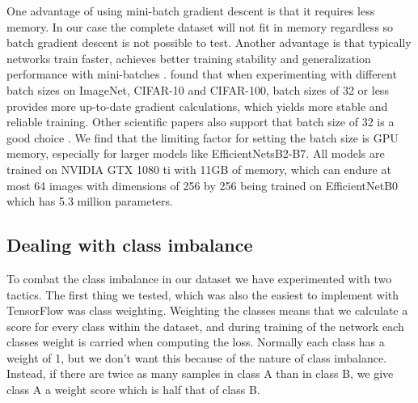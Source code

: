 \documentclass[thesis.tex]{subfiles}
\begin{document}
One advantage of using mini-batch gradient descent is that it requires less memory. In our case the complete dataset will not fit in memory regardless so batch gradient descent is not possible to test. Another advantage is that typically networks train faster, achieves better training stability and generalization performance with mini-batches \cite{RevisitingSmall18}. \citeauthor{RevisitingSmall18} found that when experimenting with different batch sizes on ImageNet, CIFAR-10 and CIFAR-100, batch sizes of 32 or less provides more up-to-date gradient calculations, which yields more stable and reliable training. Other scientific papers also support that batch size of 32 is a good choice \cite{PracticalRecommendations12, GeneralInefficiency03}.
We find that the limiting factor for setting the batch size is GPU memory, especially for larger models like EfficientNetsB2-B7. All models are trained on NVIDIA GTX 1080 ti with 11GB of memory, which can endure at most 64 images with dimensions of 256 by 256 being trained on EfficientNetB0 which has 5.3 million parameters.



\subsection{Dealing with class imbalance}
To combat the class imbalance in our dataset we have experimented with two tactics. The first thing we tested, which was also the easiest to implement with TensorFlow was class weighting. Weighting the classes means that we calculate a score for every class within the dataset, and during training of the network each classes weight is carried when computing the loss. Normally each class has a weight of 1, but we don't want this because of the nature of class imbalance. Instead, if there are twice as many samples in class A than in class B, we give class A a weight score which is half that of class B.
\end{document}

